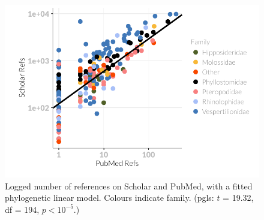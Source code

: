 \begin{knitrout}\footnotesize
{}\color{fgcolor}\begin{figure}[t]

{\centering \includegraphics[width=\textwidth]{figure/A-scholarvspubmedPlot-1} 

}

\caption[
  Logged number of references on Scholar and PubMed, with a fitted phylogenetic linear model]{
  Logged number of references on Scholar and PubMed, with a fitted phylogenetic linear model. 
  Colours indicate family. 
  (pgls: $t$ = 19.32, df = 194, $p < 10^{-5}$.)}\label{fig:scholarvspubmedPlot}
\end{figure}


\end{knitrout}




























